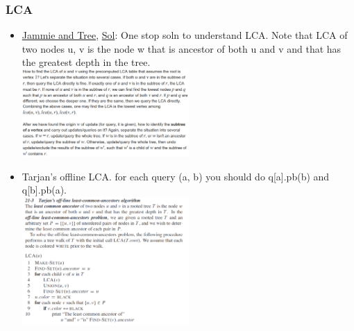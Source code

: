 \documentclass[8pt, a4paper, oneside, twocolumn]{extarticle}
\begin{document}
\subsubsection{LCA}
\begin{itemize}
    \item \href {https://codeforces.com/contest/916/problem/E}{Jammie and Tree}, \href {https://github.com/sourabh2311/Competitive-Programming/blob/master/CF/457D2/E.cpp}{Sol}: One stop soln to understand LCA. Note that LCA of two nodes u, v is the node w that is ancestor of both u and v and that has the greatest depth in the tree.\\\includegraphics[width=0.5\textwidth,height=0.5\textheight,keepaspectratio]{lca}
    \item Tarjan's offline LCA. for each query (a, b) you should do q[a].pb(b) and q[b].pb(a).
\\\includegraphics[width=0.5\textwidth,height=0.5\textheight,keepaspectratio]{tar}
\end{itemize}
\end{document}
